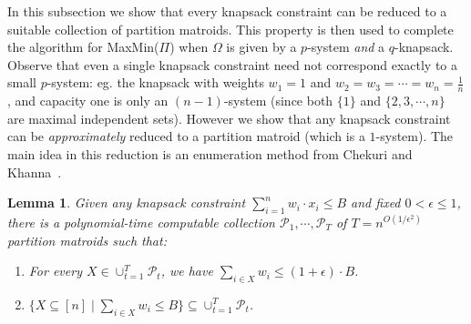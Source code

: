 \documentclass[11pt,letterpaper]{article}
\newtheorem{lemma}[theorem]{Lemma}
\def\p {\ensuremath{\mathcal{P}}\xspace}
\def\cov{\ensuremath{\Pi}\xspace}
\def\mmp{{\sf MaxMin(\cov)}\xspace}
\newcommand{\sse}{\subseteq}
\begin{document}
In this subsection we show that every knapsack constraint can be reduced to a suitable collection of partition
matroids. This property is then used to complete the algorithm for \mmp when $\Omega$ is given by a $p$-system {\em
and} a $q$-knapsack.
Observe that even a single knapsack constraint need not correspond exactly to a small $p$-system: eg. the knapsack with
weights $w_1=1$ and $w_2=w_3=\cdots=w_n=\frac1n$, and capacity one is only an $(n-1)$-system (since both $\{1\}$ and
$\{2,3,\cdots,n\}$ are maximal independent sets).
However we show that any knapsack constraint can be {\em approximately} reduced to a partition matroid (which is a
$1$-system).
The main idea in this reduction is an enumeration method from Chekuri and Khanna~\cite{CK04-multidim}.

\begin{lemma}\label{lem:knap-to-mat}
  Given any knapsack constraint $\sum_{i=1}^n w_i\cdot x_i\le B$ and
  fixed $0<\epsilon\le 1$, there is a polynomial-time computable
  collection $\p_1,\cdots,\p_T$ of $T=n^{O(1/\epsilon^2)}$ partition matroids such that:
  \begin{enumerate}
  \item For every $X\in \cup_{t=1}^T \p_t$, we have $\sum_{i\in X} w_i
    \le (1+\epsilon)\cdot B$.
  \item $\{X\sse[n] \mid \sum_{i\in X} w_i \le B\}\sse \cup_{t=1}^T
    \p_t$.
  \end{enumerate}
\end{lemma}
\end{document}
